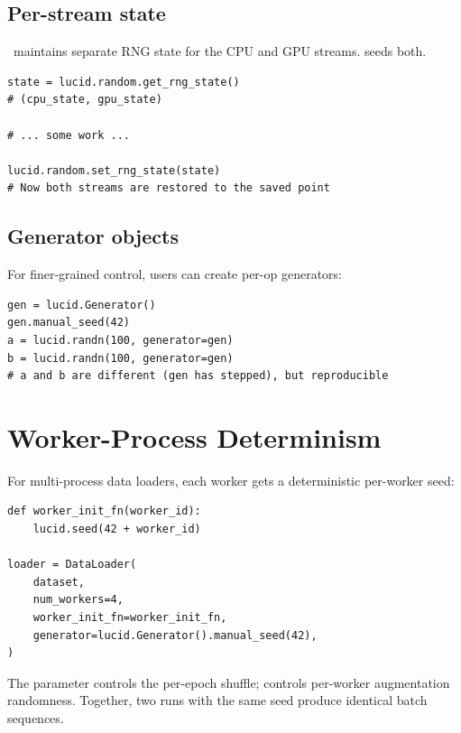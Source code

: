 \subsection{Per-stream state}
\label{ssec:reproducibility:per_stream_state}

\Lucid\ maintains separate RNG state for the CPU and GPU
streams.  seeds both.

\begin{lstlisting}[style=lucid,language=LucidPython]
state = lucid.random.get_rng_state()
# (cpu_state, gpu_state)

# ... some work ...

lucid.random.set_rng_state(state)
# Now both streams are restored to the saved point
\end{lstlisting}

\subsection{Generator objects}
\label{ssec:reproducibility:generators}

For finer-grained control, users can create per-op generators:

\begin{lstlisting}[style=lucid,language=LucidPython]
gen = lucid.Generator()
gen.manual_seed(42)
a = lucid.randn(100, generator=gen)
b = lucid.randn(100, generator=gen)
# a and b are different (gen has stepped), but reproducible
\end{lstlisting}

\section{Worker-Process Determinism}
\label{sec:reproducibility:worker_det}

For multi-process data loaders, each worker gets a deterministic
per-worker seed:

\begin{lstlisting}[style=lucid,language=LucidPython]
def worker_init_fn(worker_id):
    lucid.seed(42 + worker_id)

loader = DataLoader(
    dataset,
    num_workers=4,
    worker_init_fn=worker_init_fn,
    generator=lucid.Generator().manual_seed(42),
)
\end{lstlisting}

The  parameter controls the per-epoch shuffle;
 controls per-worker augmentation
randomness. Together, two runs with the same seed produce
identical batch sequences.

